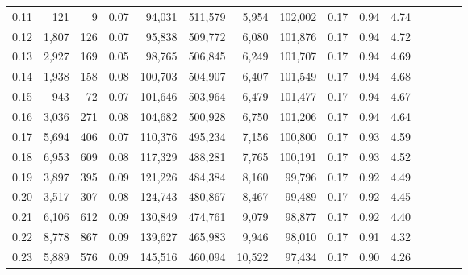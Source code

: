 \begin{tabular}{rrrcrrrrrrrrrrr}
0.11 &     121 &       9 &                                       0.07 &   94,031 &  511,579 &    5,954 &  102,002 &  0.17 &  0.94 &                         4.74 \\
0.12 &   1,807 &     126 &                                       0.07 &   95,838 &  509,772 &    6,080 &  101,876 &  0.17 &  0.94 &                         4.72 \\
0.13 &   2,927 &     169 &                                       0.05 &   98,765 &  506,845 &    6,249 &  101,707 &  0.17 &  0.94 &                         4.69 \\
0.14 &   1,938 &     158 &                                       0.08 &  100,703 &  504,907 &    6,407 &  101,549 &  0.17 &  0.94 &                         4.68 \\
0.15 &     943 &      72 &                                       0.07 &  101,646 &  503,964 &    6,479 &  101,477 &  0.17 &  0.94 &                         4.67 \\
0.16 &   3,036 &     271 &                                       0.08 &  104,682 &  500,928 &    6,750 &  101,206 &  0.17 &  0.94 &                         4.64 \\
0.17 &   5,694 &     406 &                                       0.07 &  110,376 &  495,234 &    7,156 &  100,800 &  0.17 &  0.93 &                         4.59 \\
0.18 &   6,953 &     609 &                                       0.08 &  117,329 &  488,281 &    7,765 &  100,191 &  0.17 &  0.93 &                         4.52 \\
0.19 &   3,897 &     395 &                                       0.09 &  121,226 &  484,384 &    8,160 &   99,796 &  0.17 &  0.92 &                         4.49 \\
0.20 &   3,517 &     307 &                                       0.08 &  124,743 &  480,867 &    8,467 &   99,489 &  0.17 &  0.92 &                         4.45 \\
0.21 &   6,106 &     612 &                                       0.09 &  130,849 &  474,761 &    9,079 &   98,877 &  0.17 &  0.92 &                         4.40 \\
0.22 &   8,778 &     867 &                                       0.09 &  139,627 &  465,983 &    9,946 &   98,010 &  0.17 &  0.91 &                         4.32 \\
0.23 &   5,889 &     576 &                                       0.09 &  145,516 &  460,094 &   10,522 &   97,434 &  0.17 &  0.90 &                         4.26 \\

\end{tabular}
